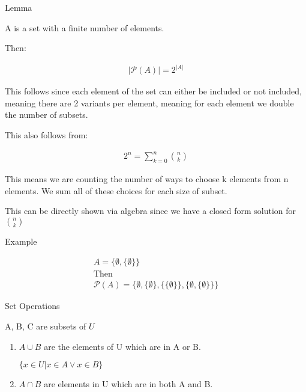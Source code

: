 \documentclass{report}
\begin{document}
\begin{description}
        \pagebreak
        {\large Lemma}
        \begin{mdframed}
            A is a set with a finite number of elements.

            Then:

            \begin{gather}
                | \mathcal{P}(A) | = 2 ^{|A|} 
            \end{gather}

            This follows since each element of the set can either
            be included or not included, meaning there are 2 variants
            per element, meaning for each element we double the number
            of subsets.

            This also follows from:

            \begin{gather}
                2^n = \sum_{k=0}^{n} \binom{n}{k} 
            \end{gather}

            This means we are counting the number of ways
            to choose k elements from n elements. We sum
            all of these choices for each size of subset.

            This can be directly shown via algebra since we
            have a closed form solution for $\binom{n}{k}$
        \end{mdframed}

    \item {\large Example}

        \begin{gather}
            A = \{\emptyset, \{ \emptyset \} \} \\
            \text{Then}\\
            \mathcal{P}(A) = \{\emptyset, \{ \emptyset \},
            \{ \{ \emptyset \} \},
        \{\emptyset, \{\emptyset \}\}\}
        \end{gather}

    \item {\large Set Operations}

        A, B, C are subsets of $U$

        \begin{enumerate}
            \item 
                $A \cup B$ are the elements of U which
                are in A or B.

                $\{ x \in U | x \in A \lor x \in B\}$

            \item $A \cap B$ are elements in U which
                are in both A and B.


\end{enumerate}
\end{description}
\end{document}
